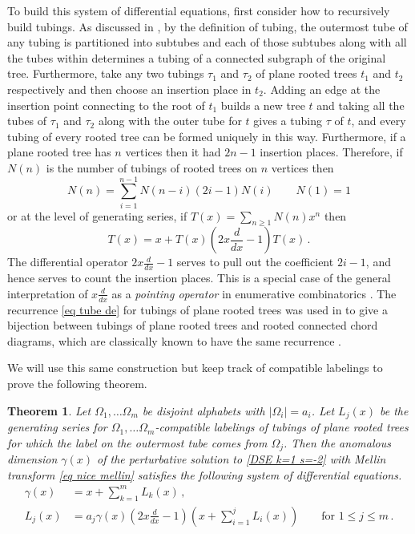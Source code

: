 \documentclass[oneside]{amsart}
\newtheorem{thm}{Theorem}[section]
\theoremstyle{definition}
\begin{document}
To build this system of differential equations, first consider how to recursively build tubings.  As discussed in \cite{BCEFNOHY}, by the definition of tubing, the outermost tube of any tubing is partitioned into subtubes and each of those subtubes along with all the tubes within determines a tubing of a connected subgraph of the original tree.  Furthermore, take any two tubings $\tau_1$ and $\tau_2$ of plane rooted trees $t_1$ and $t_2$ respectively and then choose an insertion place in $t_2$.  Adding an edge at the insertion point connecting to the root of $t_1$ builds a new tree $t$ and taking all the tubes of $\tau_1$ and $\tau_2$ along with the outer tube for $t$ gives a tubing $\tau$ of $t$, and every tubing of every rooted tree can be formed uniquely in this way.  Furthermore, if a plane rooted tree has $n$ vertices then it had $2n-1$ insertion places.  Therefore, if $N(n)$ is the number of tubings of rooted trees on $n$ vertices then
\[
N(n) = \sum_{i=1}^{n-1} N(n-i) (2i-1)N(i) \qquad N(1)=1
\]
or at the level of generating series, if $T(x)=\sum_{n\geq 1}N(n)x^n$ then
\begin{equation}\label{eq tube de}
T(x) = x + T(x) \left(2x\frac{d}{dx} -1\right)T(x)\,.
\end{equation}
The differential operator $2x\frac{d}{dx}-1$ serves to pull out the coefficient $2i-1$, and hence serves to count the insertion places.  This is a special case of the general interpretation of $x\frac{d}{dx}$ as a \emph{pointing operator} in enumerative combinatorics \cite[Ch.~A.I]{FS}.  The recurrence \eqref{eq tube de} for tubings of plane rooted trees was used in \cite{BCEFNOHY} to give a bijection between tubings of plane rooted trees and rooted connected chord diagrams, which are classically known to have the same recurrence \cite{NWchord}.

We will use this same construction but keep track of compatible labelings to prove the following theorem.
\begin{thm}\label{thm comb de}
  Let $\Omega_1, \ldots \Omega_m$ be disjoint alphabets with $|\Omega_i|=a_i$. Let $L_j(x)$ be the generating series for $\Omega_1, \ldots \Omega_m$-compatible labelings of tubings of plane rooted trees for which the label on the outermost tube comes from $\Omega_j$.   Then the anomalous dimension $\gamma(x)$ of the perturbative solution to \eqref{DSE k=1 s=-2} with Mellin transform \eqref{eq nice mellin} satisfies the following system of differential equations.
  \begin{align*} \gamma(x) & = x + \sum_{k=1}^m L_k(x)\,, \\
 L_j(x) & = a_j \gamma(x) \left(2x\frac{d}{dx}-1\right)\left(x + \sum_{i=1}^{j}L_i(x)\right) \qquad \text{for $1\leq j\leq m$}\,. \end{align*}
\end{thm}
\end{document}
